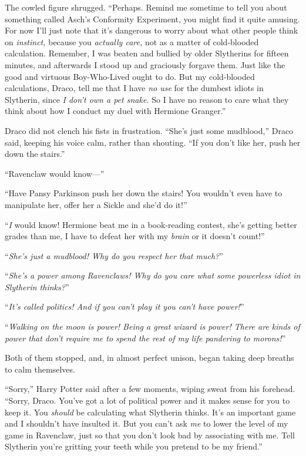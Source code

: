 The cowled figure shrugged. “Perhaps. Remind me sometime to tell you about something called Asch’s Conformity Experiment, you might find it quite amusing. For now I’ll just note that it’s dangerous to worry about what other people think on \emph{instinct,} because you \emph{actually care,} not as a matter of cold-blooded calculation. Remember, I was beaten and bullied by older Slytherins for fifteen minutes, and afterwards I stood up and graciously forgave them. Just like the good and virtuous Boy-Who-Lived ought to do. But my cold-blooded calculations, Draco, tell me that I have \emph{no use} for the dumbest idiots in Slytherin, since \emph{I don’t own a pet snake.} So I have no reason to care what they think about how I conduct my duel with Hermione Granger.”

Draco did not clench his fists in frustration. “She’s just some mudblood,” Draco said, keeping his voice calm, rather than shouting. “If you don’t like her, push her down the stairs.”

“Ravenclaw would know—”

“Have Pansy Parkinson push her down the stairs! You wouldn’t even have to manipulate her, offer her a Sickle and she’d do it!”

“\emph{I} would know! Hermione beat me in a book-reading contest, she’s getting better grades than me, I have to defeat her with my \emph{brain} or it doesn’t count!”

“\emph{She’s just a mudblood! Why do you respect her that much?}”

“\emph{She’s a power among Ravenclaws! Why do you care what some powerless idiot in Slytherin thinks?}”

“\emph{It’s called politics! And if you can’t play it you can’t have power!}”

“\emph{Walking on the moon is power! Being a great wizard is power! There are kinds of power that don’t require me to spend the rest of my life pandering to morons!}”

Both of them stopped, and, in almost perfect unison, began taking deep breaths to calm themselves.

“Sorry,” Harry Potter said after a few moments, wiping sweat from his forehead. “Sorry, Draco. You’ve got a lot of political power and it makes sense for you to keep it. You \emph{should} be calculating what Slytherin thinks. It’s an important game and I shouldn’t have insulted it. But you can’t ask \emph{me} to lower the level of my game in Ravenclaw, just so that you don’t look bad by associating with me. Tell Slytherin you’re gritting your teeth while you pretend to be my friend.”


